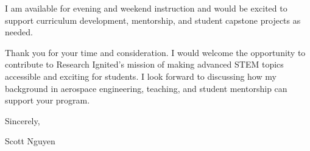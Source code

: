 \documentclass[11pt]{article}
\begin{document}
	I am available for evening and weekend instruction and would be excited to support curriculum development, mentorship, and student capstone projects as needed.
	
	Thank you for your time and consideration. I would welcome the opportunity to contribute to Research Ignited's mission of making advanced STEM topics accessible and exciting for students. I look forward to discussing how my background in aerospace engineering, teaching, and student mentorship can support your program.
	
	Sincerely,
	
	\vspace{0.2in}
	
	Scott Nguyen
	
\end{document}
